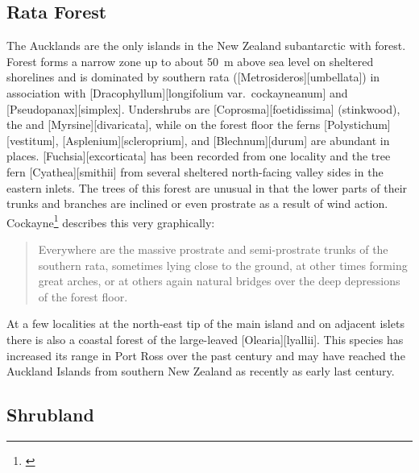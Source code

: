 \subsection{Rata Forest}

The Aucklands are the only islands in the New Zealand subantarctic with forest.
Forest forms a narrow zone up to about \SI{50}{\metre} above sea level on sheltered shorelines and is dominated by southern rata ([Metrosideros][umbellata]) in association with [Dracophyllum][longifolium var.\ cockayneanum] and [Pseudopanax][simplex].
Undershrubs are [Coprosma][foetidissima] (stinkwood), the  and [Myrsine][divaricata], while on the forest floor the ferns [Polystichum][vestitum], [Asplenium][scleroprium], and [Blechnum][durum] are abundant in places. [Fuchsia][excorticata] has been recorded from one locality and the tree fern [Cyathea][smithii] from several sheltered north-facing valley sides in the eastern inlets.
The trees of this forest are unusual in that the lower parts of their trunks and branches are inclined or even prostrate as a result of wind action.
Cockayne\footnote{\cite{cockayne1909ecological}} describes this very graphically:

\begin{quote}
	Everywhere are the massive prostrate and semi-prostrate trunks of the southern rata, sometimes lying close to the ground, at other times forming great arches, or at others again natural bridges over the deep depressions of the forest floor.
\end{quote}

At a few localities at the north-east tip of the main island and on adjacent islets there is also a coastal forest of the large-leaved [Olearia][lyallii].
This species has increased its range in Port Ross over the past century and may have reached the Auckland Islands from southern New Zealand as recently as early last century.

\subsection{Shrubland}

